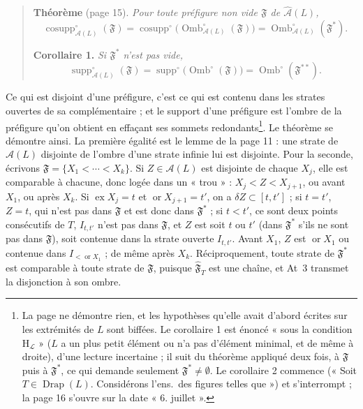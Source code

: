 \documentclass[11pt,a4paper]{article}
\begin{document}
\begin{quote}
\textbf{Théorème} (page 15). \emph{Pour toute préfigure non vide $\mathfrak{F}$
de $\widehat{\mathcal{A}}(L)$,}
\[
\operatorname{cosupp}^{\circ}_{\mathcal{A}(L)}(\mathfrak{F}) =
\operatorname{cosupp}^{\circ}\bigl(\operatorname{Omb}^{\circ}_{\mathcal{A}(L)}(\mathfrak{F})\bigr)
= \operatorname{Omb}^{\circ}_{\mathcal{A}(L)}(\mathfrak{F}^{*}) .
\]

\textbf{Corollaire 1.} \emph{Si $\mathfrak{F}^{*}$ n'est pas vide,}
\[
\operatorname{supp}^{\circ}_{\mathcal{A}(L)}(\mathfrak{F}) =
\operatorname{supp}^{\circ}\bigl(\operatorname{Omb}^{\circ}(\mathfrak{F})\bigr) =
\operatorname{Omb}^{\circ}(\mathfrak{F}^{**}) .
\]
\end{quote}

Ce qui est disjoint d'une préfigure, c'est ce qui est contenu dans les strates
ouvertes de sa complémentaire ; et le support d'une préfigure est l'ombre de la
préfigure qu'on obtient en effaçant ses sommets redondants\footnote{La page ne
démontre rien, et les hypothèses qu'elle avait d'abord écrites sur les
extrémités de $L$ sont biffées. Le corollaire 1 est énoncé « sous la condition
$\mathrm{H}_{\mathcal{L}}$ » ($L$ a un plus petit élément ou n'a pas
d'élément minimal, et de même à droite), d'une lecture incertaine ; il suit
du théorème appliqué deux fois, à $\mathfrak{F}$ puis à $\mathfrak{F}^{*}$, ce
qui demande seulement $\mathfrak{F}^{*} \neq \emptyset$. Le corollaire 2
commence (« Soit $T \in \operatorname{Drap}(L)$. Considérons l'ens.\ des figures
telles que ») et s'interrompt ; la page 16 s'ouvre sur la date « 6. juillet ».}. Le
théorème se démontre ainsi. La première égalité est le lemme de la page 11 :
une strate de $\mathcal{A}(L)$ disjointe de l'ombre d'une strate infinie lui est
disjointe. Pour la seconde, écrivons $\mathfrak{F} = \{X_{1} < \cdots <
X_{k}\}$. Si $Z \in \mathcal{A}(L)$ est disjointe de chaque $X_{j}$, elle est
comparable à chacune, donc logée dans un « trou » : $X_{j} < Z < X_{j+1}$, ou
avant $X_{1}$, ou après $X_{k}$. Si $\operatorname{ex} X_{j} = t$ et
$\operatorname{or} X_{j+1} = t'$, on a $\delta Z \subset [t, t']$ ; si $t = t'$,
$Z = t$, qui n'est pas dans $\mathfrak{F}$ et est donc dans $\mathfrak{F}^{*}$ ;
si $t < t'$, ce sont deux points consécutifs de $T$, $I_{t,t'}$ n'est pas dans
$\mathfrak{F}$, et $Z$ est soit $t$ ou $t'$ (dans $\mathfrak{F}^{*}$ s'ils ne
sont pas dans $\mathfrak{F}$), soit contenue dans la strate ouverte $I_{t,t'}$.
Avant $X_{1}$, $Z$ est $\operatorname{or} X_{1}$ ou contenue dans
$I_{<\operatorname{or} X_{1}}$ ; de même après $X_{k}$. Réciproquement, toute
strate de $\mathfrak{F}^{*}$ est comparable à toute strate de $\mathfrak{F}$,
puisque $\widehat{\mathfrak{F}}_{T}$ est une chaîne, et At~3 transmet la
disjonction à son ombre.
\end{document}
